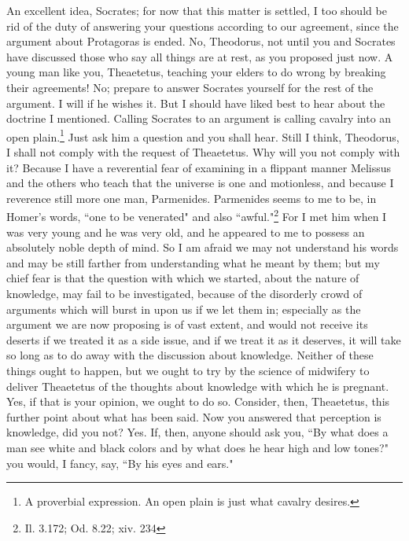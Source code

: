 \documentclass[letterpaper,12pt]{article}
\newcommand{\stephpag}[1]{\marginnote{\small\itshape\fontfamily{ppl}\selectfont #1}}
\begin{document}
\begin{drama}
\theodorusspeaks
An excellent idea, Socrates; for now that this matter is settled, I too should be rid of the duty of answering your questions according to our agreement, since the argument about Protagoras is ended.
\theaetetusspeaks
No, Theodorus, not until you and Socrates \stephpag{d} have discussed those who say all things are at rest, as you proposed just now.
\theodorusspeaks
A young man like you, Theaetetus, teaching your elders to do wrong by breaking their agreements! No; prepare to answer Socrates yourself for the rest of the argument.
\theaetetusspeaks
I will if he wishes it. But I should have liked best to hear about the doctrine I mentioned.
\theodorusspeaks
Calling Socrates to an argument is calling cavalry into an open plain.\footnote{A proverbial expression. An open plain is just what cavalry desires.} Just ask him a question and you shall hear.
\socratesspeaks
Still I think, Theodorus, \stephpag{e} I shall not comply with the request of Theaetetus.
\theodorusspeaks
Why will you not comply with it?
\socratesspeaks
Because I have a reverential fear of examining in a flippant manner Melissus and the others who teach that the universe is one and motionless, and because I reverence still more one man, Parmenides. Parmenides seems to me to be, in Homer's words, ``one to be venerated" and also ``awful."\footnote{Il. 3.172; Od. 8.22; xiv. 234} For I met him when I was very young and he was very old, and he appeared to me to possess an absolutely noble depth of mind. \stephpag{184 a} So I am afraid we may not understand his words and may be still farther from understanding what he meant by them; but my chief fear is that the question with which we started, about the nature of knowledge, may fail to be investigated, because of the disorderly crowd of arguments which will burst in upon us if we let them in; especially as the argument we are now proposing is of vast extent, and would not receive its deserts if we treated it as a side issue, and if we treat it as it deserves, it will take so long as to do away with the discussion about knowledge. Neither of these things ought to happen, but we ought to try by the science of midwifery to deliver Theaetetus of the thoughts \stephpag{b} about knowledge with which he is pregnant.
\theodorusspeaks
Yes, if that is your opinion, we ought to do so.
\socratesspeaks
Consider, then, Theaetetus, this further point about what has been said. Now you answered that perception is knowledge, did you not?
\theaetetusspeaks
Yes.
\socratesspeaks
If, then, anyone should ask you, ``By what does a man see white and black colors and by what does he hear high and low tones?" you would, I fancy, say, ``By his eyes and ears."

\end{drama}
\end{document}
